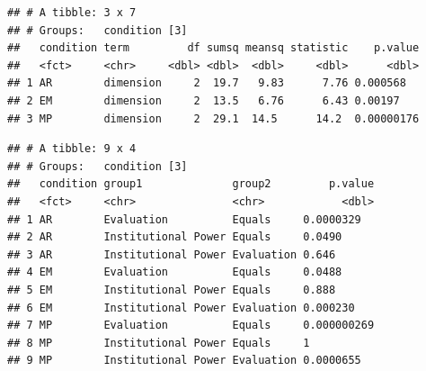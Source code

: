 \documentclass[
]{article}
\newenvironment{Shaded}{\begin{snugshade}}{\end{snugshade}}
\newcommand{\AttributeTok}[1]{\textcolor[rgb]{0.13,0.29,0.53}{#1}}
\newcommand{\ConstantTok}[1]{\textcolor[rgb]{0.56,0.35,0.01}{#1}}
\newcommand{\FunctionTok}[1]{\textcolor[rgb]{0.13,0.29,0.53}{\textbf{#1}}}
\newcommand{\NormalTok}[1]{#1}
\newcommand{\OtherTok}[1]{\textcolor[rgb]{0.56,0.35,0.01}{#1}}
\newcommand{\SpecialCharTok}[1]{\textcolor[rgb]{0.81,0.36,0.00}{\textbf{#1}}}
\newcommand{\StringTok}[1]{\textcolor[rgb]{0.31,0.60,0.02}{#1}}
\begin{document}
\begin{verbatim}
## # A tibble: 3 x 7
## # Groups:   condition [3]
##   condition term         df sumsq meansq statistic    p.value
##   <fct>     <chr>     <dbl> <dbl>  <dbl>     <dbl>      <dbl>
## 1 AR        dimension     2  19.7   9.83      7.76 0.000568  
## 2 EM        dimension     2  13.5   6.76      6.43 0.00197   
## 3 MP        dimension     2  29.1  14.5      14.2  0.00000176
\end{verbatim}

\begin{Shaded}
\end{Shaded}

\begin{verbatim}
## # A tibble: 9 x 4
## # Groups:   condition [3]
##   condition group1              group2         p.value
##   <fct>     <chr>               <chr>            <dbl>
## 1 AR        Evaluation          Equals     0.0000329  
## 2 AR        Institutional Power Equals     0.0490     
## 3 AR        Institutional Power Evaluation 0.646      
## 4 EM        Evaluation          Equals     0.0488     
## 5 EM        Institutional Power Equals     0.888      
## 6 EM        Institutional Power Evaluation 0.000230   
## 7 MP        Evaluation          Equals     0.000000269
## 8 MP        Institutional Power Equals     1          
## 9 MP        Institutional Power Evaluation 0.0000655
\end{verbatim}
\end{document}
